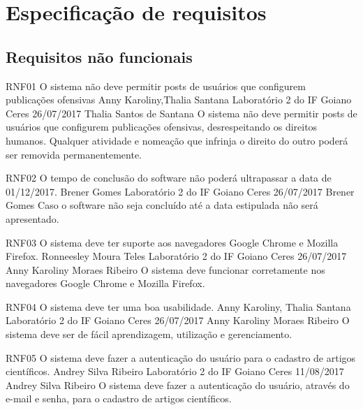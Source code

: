\chapter{Especificação de requisitos}
 	
 \section{Requisitos não funcionais}
 
 \requisitoNaoFuncional
 {RNF01}
 {O sistema não deve permitir posts de usuários que configurem publicações ofensivas}
 {Anny Karoliny,Thalia Santana}
 {Laboratório 2 do IF Goiano Ceres}
 {26/07/2017}
 {Thalia Santos de Santana}
 {O sistema não deve permitir posts de usuários que configurem publicações ofensivas, desrespeitando os direitos humanos. Qualquer atividade e nomeação que infrinja o direito do outro poderá ser removida permanentemente.
 }
 
 \requisitoNaoFuncional
 {RNF02}
 {O tempo de conclusão do software não poderá ultrapassar a data de 01/12/2017.}
 {Brener Gomes}
 {Laboratório 2 do IF Goiano Ceres}
 {26/07/2017}
 {Brener Gomes}
 {Caso o software não seja concluído até a data estipulada não será apresentado.
 }
 
 \requisitoNaoFuncional
 {RNF03}
 {O sistema  deve ter suporte aos navegadores Google Chrome e Mozilla Firefox.}
 {Ronneesley Moura Teles}
 {Laboratório 2 do IF Goiano Ceres}
 {26/07/2017}
 {Anny Karoliny Moraes Ribeiro}
 {O sistema deve funcionar corretamente nos navegadores Google Chrome e Mozilla Firefox.
 }
 
 \requisitoNaoFuncional
 {RNF04}
 {O sistema deve ter uma boa usabilidade.}
 {Anny Karoliny, Thalia Santana}
 {Laboratório 2 do IF Goiano Ceres}
 {26/07/2017}
 {Anny Karoliny Moraes Ribeiro}
 {O sistema deve ser de fácil aprendizagem, utilização e gerenciamento.
 }

  \requisitoNaoFuncional
 {RNF05}
 {O sistema deve fazer a autenticação do usuário para o cadastro de artigos científicos.}
 {Andrey Silva Ribeiro}
 {Laboratório 2 do IF Goiano Ceres}
 {11/08/2017}
 {Andrey Silva Ribeiro}
 {O sistema deve fazer a autenticação do usuário, através do e-mail e senha, para o cadastro de artigos científicos.
 }
 
